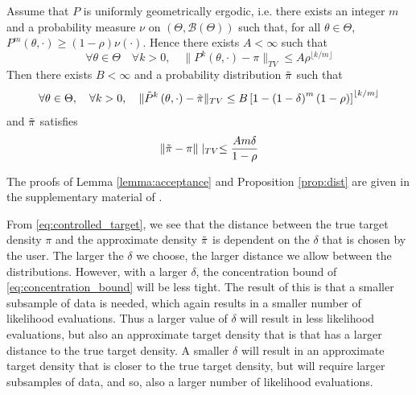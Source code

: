 \begin{proposition}\label{prop:dist}
Assume that $P$ is uniformly geometrically ergodic, i.e. there exists an integer $m$ and a probability measure $\nu$ on $\left(\Theta, \mathcal{B}\left(\Theta\right)\right)$ such that, for all $\theta \in \Theta$, $P^m\left(\theta, \cdot\right) \geq \left(1 - \rho\right)\nu\left(\cdot\right)$. Hence there exists $A < \infty$ such that
\begin{equation*}
    \forall \theta \in \Theta \quad \forall k > 0, \quad \lVert P^k\left(\theta, \cdot\right) - \pi \rVert_{TV} \leq A\rho^{\lfloor k/m \rfloor} 
\end{equation*}
Then there exists $B < \infty$ and a probability distribution $\Tilde{\pi}$ such that 
\begin{equation*}
    \forall \theta \in \Theta, \quad \forall k > 0, \quad \lVert \Tilde{P}^k\left(\theta, \cdot\right) - \Tilde{\pi}\rVert_{TV} \leq B\left[ 1 - \left(1- \delta\right)^m \left(1-\rho\right)\right]^{\lfloor k/m\rfloor}
\end{equation*}
and $\Tilde{\pi}$ satisfies 
\begin{equation*}\label{eq:controlled_target}
    \lVert \Tilde{\pi} - \pi \rVert \mid_{TV} \leq \frac{A m\delta}{1-\rho} 
\end{equation*}
\end{proposition}
The proofs of Lemma \ref{lemma:acceptance} and Proposition \ref{prop:dist} are given in the supplementary material of \cite{Bardenet:2}. 

From \eqref{eq:controlled_target}, we see that the distance between the true target density $\pi$ and the approximate density $\Tilde{\pi}$ is dependent on the $\delta$ that is chosen by the user. The larger the $\delta$ we choose, the larger distance we allow between the distributions. However, with a larger $\delta$, the concentration bound of  \eqref{eq:concentration_bound} will be less tight. The result of this is that a smaller subsample of data is needed, which again results in a smaller number of likelihood evaluations. Thus a larger value of $\delta$ will result in less likelihood evaluations, but also an approximate target density that is that has a larger distance to the true target density. A smaller $\delta$ will result in an approximate target density that is closer to the true target density, but will require larger subsamples of data, and so, also a larger number of likelihood evaluations. 



